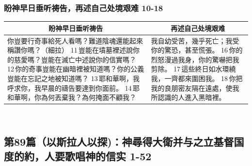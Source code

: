 \subsubsection{盼神早日垂听祷告，再述自己处境艰难 10-18}
\begin{table}[H]
\centering
\begin{tabular}{p{10.25cm}|p{7.00cm}}\hline\hline
\multicolumn{1}{c|}{盼神早日垂听祷告}&\multicolumn{1}{c}{再述自己处境艰难}\\\hline
你豈要行奇事給死人看嗎？難道陰魂還能起來稱讚你嗎？（細拉）
11 豈能在墳墓裡述說你的慈愛嗎？豈能在滅亡中述說你的信實嗎？
12 你的奇事豈能在幽暗裡被知道嗎？你的公義豈能在忘記之地被知道嗎？
13 耶和華啊，我呼求你，我早晨的禱告要達到你面前。
14 耶和華啊，你為何丟棄我？為何掩面不顧我？
&我自幼受苦，幾乎死亡；我受你的驚恐，甚至慌張。
16 你的烈怒漫過我身，你的驚嚇把我剪除。
17 這些終日如水環繞我，一齊都來圍困我。
18 你把我的良朋密友隔在遠處，使我所認識的人進入黑暗裡。\\\hline
\end{tabular}
\end{table} 


\subsection{第89篇（以斯拉人以探)：神尋得大衛并与之立基督国度的約，人要歌唱神的信实 1-52}
